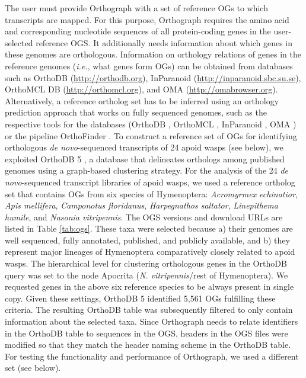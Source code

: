 The user must provide Orthograph with a set of reference OGs to which
transcripts are mapped. For this purpose, Orthograph requires the amino
acid and corresponding nucleotide sequences of all protein-coding genes
in the user-selected reference OGS. It additionally needs information
about which genes in these genomes are orthologous. Information on
orthology relations of genes in the reference genomes (\emph{i.e.}, what
genes form OGs) can be obtained from databases such as OrthoDB
(\url{http://orthodb.org}), InParanoid
(\url{http://inparanoid.sbc.su.se}), OrthoMCL DB
(\url{http://orthomcl.org}), and OMA (\url{http://omabrowser.org}).
Alternatively, a reference ortholog set has to be inferred using an
orthology prediction approach that works on fully sequenced genomes,
such as the respective tools for the databases (OrthoDB
\citep{Kriventseva2015}, OrthoMCL \citep{Li2003}, InParanoid
\citep{Sonnhammer2015}, OMA \citep{Altenhoff2015}) or the pipeline
OrthoFinder \citep{Emms2015}. To construct a reference set of OGs for
identifying orthologous \emph{de novo}-sequenced transcripts of 24 apoid
wasps (see below), we exploited OrthoDB 5 \citep{Waterhouse2011a}, a
database that delineates orthologs among published genomes using a
graph-based clustering strategy. For the analysis of the 24 \emph{de
novo}-sequenced transcript libraries of apoid wasps, we used a reference
ortholog set that contains OGs from six species of Hymenoptera:
\emph{Acromyrmex echinatior}, \emph{Apis mellifera}, \emph{Camponotus
floridanus}, \emph{Harpegnathos saltator}, \emph{Linepithema humile},
and \emph{Nasonia vitripennis}. The OGS versions and download URLs are
listed in Table \ref{tab:ogs}. These taxa were selected because a) their genomes
are well sequenced, fully annotated, published, and publicly available,
and b) they represent major lineages of Hymenoptera comparatively
closely related to apoid wasps. The hierarchical level for clustering
orthologous genes in the OrthoDB query was set to the node Apocrita
(\emph{N. vitripennis}/rest of Hymenoptera). We requested genes in the
above six reference species to be always present in single copy. Given
these settings, OrthoDB 5 identified 5,561 OGs fulfilling these
criteria. The resulting OrthoDB table was subsequently filtered to only
contain information about the selected taxa. Since Orthograph needs to
relate identifiers in the OrthoDB table to sequences in the OGS, headers
in the OGS files were modified so that they match the header naming
scheme in the OrthoDB table. For testing the functionality and
performance of Orthograph, we used a different set (see below).

